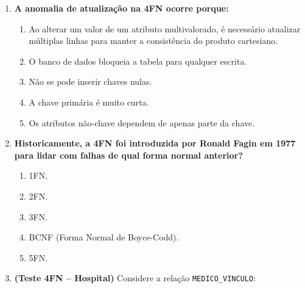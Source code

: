 \documentclass[12pt]{article}
\begin{document}
\begin{enumerate}[label=\textbf{Questão \arabic*:}, leftmargin=*]
  \vspace{0.4cm}
  \item \textbf{A anomalia de atualização na 4FN ocorre porque:}
  \begin{enumerate}[label=\alph*)]
    \item Ao alterar um valor de um atributo multivalorado, é necessário atualizar múltiplas linhas para manter a consistência do produto cartesiano.
    \item O banco de dados bloqueia a tabela para qualquer escrita.
    \item Não se pode inserir chaves nulas.
    \item A chave primária é muito curta.
    \item Os atributos não-chave dependem de apenas parte da chave.
  \end{enumerate}

  \item \textbf{Historicamente, a 4FN foi introduzida por Ronald Fagin em 1977 para lidar com falhas de qual forma normal anterior?}
  \begin{enumerate}[label=\alph*)]
    \item 1FN.
    \item 2FN.
    \item 3FN.
    \item BCNF (Forma Normal de Boyce-Codd).
    \item 5FN.
  \end{enumerate}
  \item \textbf{(Teste 4FN -- Hospital)} Considere a relação \texttt{MEDICO\_VINCULO}:
  

\end{enumerate}
\end{document}
